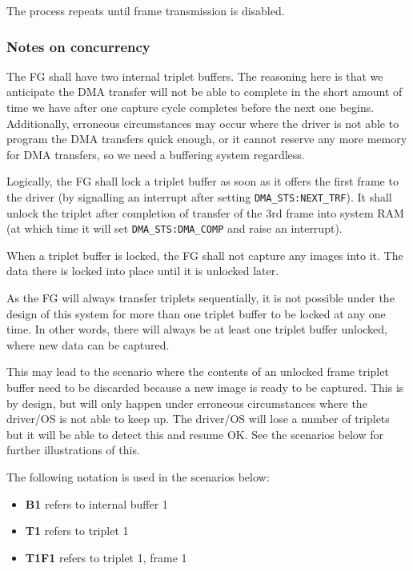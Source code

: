 \documentclass[12pt]{article}
\begin{document}
The process repeats until frame transmission is disabled.

\subsubsection{Notes on concurrency}

The FG shall have two internal triplet buffers. The reasoning here is that we anticipate the DMA transfer will not be able to complete in the short amount of time we have after one capture cycle completes before the next one begins. Additionally, erroneous circumstances may occur where the driver is not able to program the DMA transfers quick enough, or it cannot reserve any more memory for DMA transfers, so we need a buffering system regardless.

Logically, the FG shall lock a triplet buffer as soon as it offers the first frame to the driver (by signalling an interrupt after setting \texttt{DMA\_STS:NEXT\_TRF}). It shall unlock the triplet after completion of transfer of the 3rd frame into system RAM (at which time it will set \texttt{DMA\_STS:DMA\_COMP} and raise an interrupt).

When a triplet buffer is locked, the FG shall not capture any images into it. The data there is locked into place until it is unlocked later.

As the FG will always transfer triplets sequentially, it is not possible under the design of this system for more than one triplet buffer to be locked at any one time. In other words, there will always be at least one triplet buffer unlocked, where new data can be captured.

This may lead to the scenario where the contents of an unlocked frame triplet buffer need to be discarded because a new image is ready to be captured. This is by design, but will only happen under erroneous circumstances where the driver/OS is not able to keep up. The driver/OS will lose a number of triplets but it will be able to detect this and resume OK. See the scenarios below for further illustrations of this.

The following notation is used in the scenarios below:

\begin{itemize}
\item \textbf{B1} refers to internal buffer 1
\item \textbf{T1} refers to triplet 1
\item \textbf{T1F1} refers to triplet 1, frame 1
\end{itemize}
\end{document}

